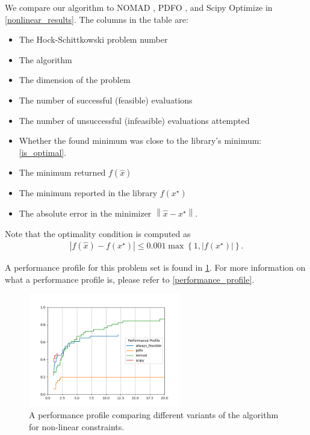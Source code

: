 
We compare our algorithm to NOMAD \cite{AMAIOUA201813}, PDFO \cite{PDFO}, and Scipy Optimize
in \cref{nonlinear_results}.
The columns in the table are:
\begin{itemize}
\item The Hock-Schittkowski problem number
\item The algorithm
\item The dimension of the problem
\item The number of successful (feasible) evaluations
\item The number of unsuccessful (infeasible) evaluations attempted
\item Whether the found minimum was close to the library's minimum: \cref{is_optimal}.
\item The minimum returned $f(\hat x)$
\item The minimum reported in the library $f(x^{\star})$
\item The absolute error in the minimizer $\left\|\hat x - x^{\star}\right\|$.
\end{itemize}
Note that the optimality condition is computed as
\begin{align}
\left|f\left(\hat x\right) - f\left(x^{\star}\right)\right| \le 0.001 \max\left\{1, \left|f\left(x^{\star}\right)\right|\right\}. \label{is_optimal}
\end{align}

A performance profile for this problem set is found in \cref{nonlinear_performance_profile_image}.
For more information on what a performance profile is, please refer to \cref{performance_profile}.

\begin{figure}[ht]
    \centering
    \includegraphics[width=250px]{images/nonlinear_performance_profile.png}
    \caption[A performance profile comparing different variants of the algorithm for non-linear constraints.]{
    	A performance profile comparing different variants of the algorithm for non-linear constraints.
    }
    \label{nonlinear_performance_profile_image}
\end{figure}


